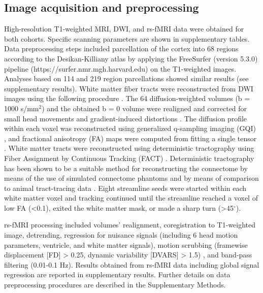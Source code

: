 \begin{refsection}
\subsection*{Image acquisition and preprocessing}
High-resolution T1-weighted MRI, DWI, and rs-fMRI data were obtained for both cohorts. Specific scanning parameters are shown in supplementary tables. Data preprocessing steps \citep{vanDenHeuvel2013AbnormalRC} included parcellation of the cortex into 68 regions according to the Desikan-Killiany atlas \citep{DESIKAN2006968} by applying the FreeSurfer (version 5.3.0) pipeline (https://surfer.nmr.mgh.harvard.edu) on the T1-weighted images. Analyses based on 114 and 219 region parcellations \citep{CAMMOUN2012386} showed similar results (see supplementary results). White matter fiber tracts were reconstructed from DWI images using the following procedure \citep{VANDENHEUVEL2016293}. The 64 diffusion-weighted volumes (b = 1000 s/mm$^{2}$) and the obtained b = 0 volume were realigned and corrected for small head movements and gradient-induced distortions \citep{ANDERSSON2002177}. The diffusion profile within each voxel was reconstructed using generalized q-sampling imaging (GQI) \citep{YEH2010}, and fractional anisotropy (FA) maps were computed from fitting a single tensor \citep{Chang2005RESTORERE}. White matter tracts were reconstructed using deterministic tractography using Fiber Assignment by Continuous Tracking (FACT) \citep{Mori2002FiberTP}. Deterministic tractography has been shown to be a suitable method for reconstructing the connectome by means of the use of simulated connectome phantoms \citep{Sarwar2019MappingCW} and by means of comparison to animal tract-tracing data \citep{vanDenHeuvel2015ComparisonOD,Shen2019ExploringTL}. Eight streamline seeds were started within each white matter voxel and tracking continued until the streamline reached a voxel of low FA (<0.1), exited the white matter mask, or made a sharp turn (>45$^{\circ}$).

rs-fMRI processing included volumes' realignment, coregistration to T1-weighted image, detrending, regression for nuisance signals (including 6 head motion parameters, ventricle, and white matter signals), motion scrubbing (framewise displacement [FD] > 0.25, dynamic variability [DVARS] > 1.5) \citep{Power2012SpuriousBS}, and band-pass filtering (0.01-0.1 Hz). Results obtained from rs-fMRI data including global signal regression are reported in supplementary results. Further details on data preprocessing procedures are described in the Supplementary Methods.


\end{refsection}
